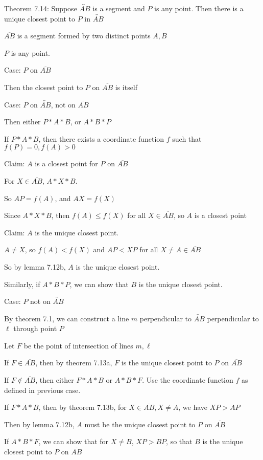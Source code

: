 \documentclass[11pt]{article}
\newcommand{\lines}[1]{\overleftrightarrow{#1}}
\newcommand{\segment}[1]{\overline{#1}}
\begin{document}
\begin{itemize}
	Theorem 7.14: Suppose $\lines{AB}$ is a segment and $P$ is any point. Then there is a unique closest point to $P$ in $\lines{AB}$

	
	$\segment{AB}$ is a segment formed by two distinct points $A,B$
	
	$P$ is any point. 

	Case: $P$ on $\segment{AB}$

	Then the closest point to $P$ on $\segment{AB}$ is itself

	Case: $P$ on $\lines{AB}$, not on $\segment{AB}$

	Then either $P * A * B$, or $A * B * P$

	If $P * A * B$, then there exists a coordinate function $f$ such that $f(P) = 0, f(A) > 0$

	Claim: $A$ is a closest point for $P$ on $\segment{AB}$
	
	For $X \in \segment{AB}$, $A * X * B$. 

	So $AP = f(A)$, and $AX = f(X)$

	Since $A * X * B$, then $f(A) \leq f(X)$ for all $X \in \segment{AB}$, so $A$ is a closest point

	Claim: $A$ is the unique closest point.

	$A \neq X$, so $f(A) < f(X)$ and $AP < XP$ for all $X \neq A \in \segment{AB}$

	So by lemma 7.12b, $A$ is the unique closest point.

	Similarly, if $A * B * P$, we can show that $B$ is the unique closest point.

	Case: $P$ not on $\lines{AB}$

	By theorem 7.1, we can construct a line $m$ perpendicular to $\lines{AB}$ perpendicular to $\ell$ through point $P$

	Let $F$ be the point of intersection of lines $m, \ell$

	If $F \in \segment{AB}$, then by theorem 7.13a, $F$ is the unique closest point to $P$ on $\segment{AB}$

	If $F \not \in \segment{AB}$, then either $F * A * B$ or $A * B * F$. Use the coordinate function $f$ as defined in previous case.

	If $F * A * B$, then by theorem 7.13b, for $X \in \segment{AB}, X \neq A$, we have $XP > AP$

	Then by lemma 7.12b, $A$ must be the unique closest point to $P$ on $\segment{AB}$

	If $A * B * F$, we can show that for $X \neq B$, $XP > BP$, so that $B$ is the unique closest point to $P$ on $\segment{AB}$

\end{itemize}
\end{document}

